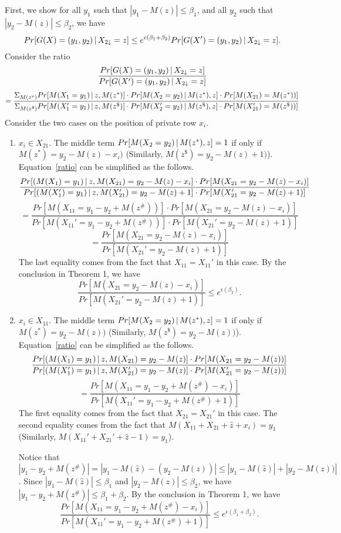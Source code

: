 \documentclass[11pt]{article}
\begin{document}
First, we show for all $y_{1}$ such that $|y_{1} - M(\hat{z})| \leq \beta_{1}$, and all $y_{2}$ such that $|y_{2} - M(z)| \leq \beta_{2}$, we have
\[
Pr[G(X) = (y_{1}, y_{2})\,|\,X_{2 \downarrow}=z] \leq e^{ \epsilon(\beta_{1}+\beta_{2})  } Pr[G(X') = (y_{1}, y_{2})\,|\,X_{2 \downarrow}=z].
\]
Consider the ratio
\[
\frac{Pr[G(X) = (y_{1}, y_{2})\,|\,X_{2 \downarrow}=z]}{Pr[G(X') = (y_{1}, y_{2})\,|\,X_{2 \downarrow}=z]}
\]
\begin{equation}\label{ratio}
=\frac{\Sigma_{M(z^{*})} Pr[M(X_{1} = y_{1})\,|\,z, M(z^{*})] \cdot Pr[M(X_{2}=y_{2})\,|\,M(z^{*}), z] \cdot Pr[M(X_{21}) = M(z^{*}))] }{\Sigma_{M(z^{\$})} Pr[M(X_{1}' = y_{1})\,|\,z, M(z^{\$})] \cdot Pr[M(X_{2}'=y_{2})\,|\,M(z^{\$}), z] \cdot Pr[M(X_{21}') = M(z^{\$}))]}
\end{equation}
Consider the two cases on the position of private row $x_{i}$.
\begin{enumerate}
\item $x_{i} \in X_{21}$. The middle term $Pr[M(X_{2}=y_{2})\,|\,M(z^{*}), z] =1$ if only if $M(z^{*}) = y_{2} - M(z)-x_{i})$ (Similarly, $M(z^{\$}) = y_{2} - M(z)+1)$). Equation~\ref{ratio} can be simplified as the follows.
\[
\frac {Pr[(M(X_{1})= y_{1})\,|\,z, M(X_{21}) = y_{2}-M(z)-x_{i}] \cdot Pr [M(X_{21} = y_{2} - M(z)-x_{i})]}{Pr[(M(X_{1}')= y_{1})\,|\,z, M(X_{21}') = y_{2}-M(z)+1] \cdot Pr [M(X_{21}' = y_{2} - M(z)+1)]}
\]
\[
=\frac{Pr[{M(X_{11}= y_{1} - y_{2} + M(z^{\#}))}] \cdot Pr [M(X_{21} = y_{2} - M(z)-x_{i})]}{Pr[{M(X_{11}'= y_{1} - y_{2} + M(z^{\#}))}] \cdot Pr [M(X_{21}' = y_{2} - M(z)+1)]}
\]
\[
=\frac{ Pr [M(X_{21} = y_{2} - M(z)-x_{i})]}{Pr [M(X_{21}' = y_{2} - M(z)+1)]}
\]
The last equality comes from the fact that $X_{11}= X_{11}'$ in this case. By the conclusion in Theorem 1, we have
\[
\frac{Pr [M(X_{21} = y_{2} - M(z)-x_{i})]}{Pr [M(X_{21}' = y_{2} - M(z)+1)]} \leq e^{\epsilon(\beta_{2})}.
\]
\item $x_{i} \in X_{11}$. The middle term $Pr[M(X_{2}=y_{2})\,|\,M(z^{*}), z] =1$ if only if $M(z^{*}) = y_{2} - M(z))$ (Similarly, $M(z^{\$}) = y_{2} - M(z))$). Equation~\ref{ratio} can be simplified as the follows.
\[
\frac {Pr[(M(X_{1})= y_{1})\,|\,z, M(X_{21}) = y_{2}-M(z)] \cdot Pr [M(X_{21} = y_{2} - M(z))]}{Pr[(M(X_{1}')= y_{1})\,|\,z, M(X_{21}') = y_{2}-M(z)] \cdot Pr [M(X_{21}' = y_{2} - M(z))]}
\]
\[
=\frac{Pr[{M(X_{11}= y_{1} - y_{2} + M(z^{\#}) - x_{i})}] }{Pr[{M(X_{11}'= y_{1} - y_{2} + M(z^{\#})+1)}] }
\]
The first equality comes from the fact that $X_{21}= X_{21}'$ in this case. The second equality comes from the fact that $M(X_{11}+X_{21}+\hat{z}+x_{i}) =y_{1}$ (Similarly, $M(X_{11}'+X_{21}'+\hat{z}-1) =y_{1}$).

Notice that $|y_{1} - y_{2} + M(z^{\#})| = |y_{1} - M(\hat{z}) - (y_{2} - M(z))| \leq |y_{1} - M(\hat{z})| + |y_{2} - M(z)) |$. Since $|y_{1} - M(\hat{z})| \leq \beta_{1}$ and $|y_{2} - M(z)| \leq \beta_{2}$, we have $|y_{1} - y_{2} + M(z^{\#})| \leq \beta_{1}+ \beta_{2}$. By the conclusion in Theorem 1, we have
\[
\frac{Pr[{M(X_{11}= y_{1} - y_{2} + M(z^{\#}) - x_{i})}] }{Pr[{M(X_{11}'= y_{1} - y_{2} + M(z^{\#})+1)}] } \leq e^{\epsilon(\beta_{1}+\beta_{2})}.
\]
\end{enumerate}
\end{document}
